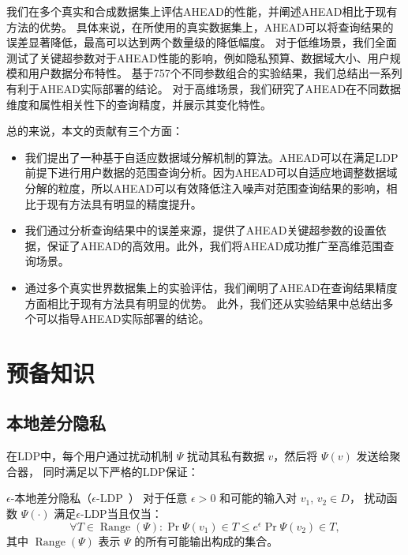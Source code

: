 我们在多个真实和合成数据集上评估AHEAD的性能，并阐述AHEAD相比于现有方法的优势。
具体来说，在所使用的真实数据集上，AHEAD可以将查询结果的误差显著降低，最高可以达到两个数量级的降低幅度。
对于低维场景，我们全面测试了关键超参数对于AHEAD性能的影响，例如隐私预算、数据域大小、用户规模和用户数据分布特性。
基于757个不同参数组合的实验结果，我们总结出一系列有利于AHEAD实际部署的结论。
对于高维场景，我们研究了AHEAD在不同数据维度和属性相关性下的查询精度，并展示其变化特性。

总的来说，本文的贡献有三个方面：
\begin{itemize}
    \item 我们提出了一种基于自适应数据域分解机制的算法。AHEAD可以在满足LDP前提下进行用户数据的范围查询分析。因为AHEAD可以自适应地调整数据域分解的粒度，所以AHEAD可以有效降低注入噪声对范围查询结果的影响，相比于现有方法具有明显的精度提升。
    \item 我们通过分析查询结果中的误差来源，提供了AHEAD关键超参数的设置依据，保证了AHEAD的高效用。此外，我们将AHEAD成功推广至高维范围查询场景。
    \item 通过多个真实世界数据集上的实验评估，我们阐明了AHEAD在查询结果精度方面相比于现有方法具有明显的优势。
    此外，我们还从实验结果中总结出多个可以指导AHEAD实际部署的结论。
\end{itemize}


\section{预备知识}
\subsection{本地差分隐私}
在LDP中，每个用户通过扰动机制 $\Psi$ 扰动其私有数据 $v$，然后将 $\Psi(v)$ 发送给聚合器，
同时满足以下严格的LDP保证：

\begin{definition}{$\epsilon$-本地差分隐私（$\epsilon$-LDP~\cite{kasiviswanathan2011can}）} 
    对于任意 $\epsilon > 0$ 和可能的输入对 $v_1$, $v_2 \in D$，
    扰动函数 $\Psi(\cdot)$ 满足$\epsilon$-LDP当且仅当：
    \begin{equation}
        \forall T \in \operatorname{Range}(\Psi): \Pr{\Psi\left(v_{1}\right) \in T} \leq e^{\epsilon} \Pr {\Psi\left(v_{2}\right) \in T},  \nonumber
    \end{equation}
    其中 $\operatorname{Range}(\Psi)$ 表示 $\Psi$ 的所有可能输出构成的集合。
\end{definition}

